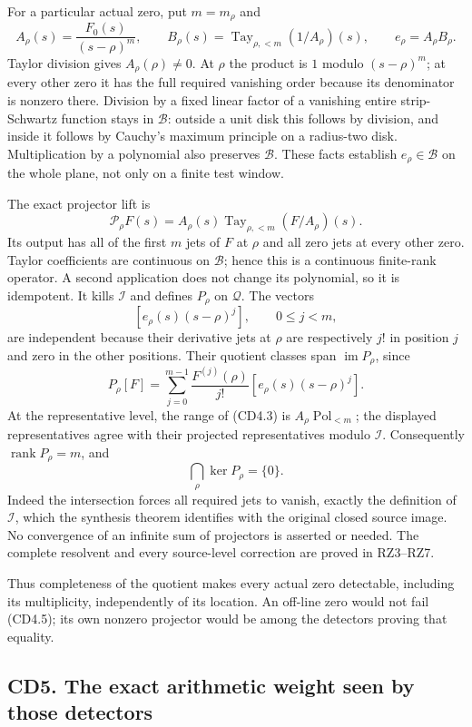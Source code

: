 \documentclass[
]{article}
\begin{document}
For a particular actual zero, put \(m=m_\rho\) and \[
A_\rho(s)=\frac{F_0(s)}{(s-\rho)^m},\qquad
B_\rho(s)=\operatorname{Tay}_{\rho,<m}(1/A_\rho)(s),\qquad
e_\rho=A_\rho B_\rho.
\tag{CD4.2}
\] Taylor division gives \(A_\rho(\rho)\ne0\). At \(\rho\) the product
is \(1\) modulo \((s-\rho)^m\); at every other zero it has the full
required vanishing order because its denominator is nonzero there.
Division by a fixed linear factor of a vanishing entire strip-Schwartz
function stays in \(\mathcal B\): outside a unit disk this follows by
division, and inside it follows by Cauchy's maximum principle on a
radius-two disk. Multiplication by a polynomial also preserves
\(\mathcal B\). These facts establish \(e_\rho\in\mathcal B\) on the
whole plane, not only on a finite test window.

The exact projector lift is \[
\mathscr P_\rho F(s)=A_\rho(s)
\operatorname{Tay}_{\rho,<m}(F/A_\rho)(s).
\tag{CD4.3}
\] Its output has all of the first \(m\) jets of \(F\) at \(\rho\) and
all zero jets at every other zero. Taylor coefficients are continuous on
\(\mathcal B\); hence this is a continuous finite-rank operator. A
second application does not change its polynomial, so it is idempotent.
It kills \(\mathcal I\) and defines \(P_\rho\) on \(\mathcal Q\). The
vectors \[
[e_\rho(s)(s-\rho)^j],\qquad 0\le j<m,
\tag{CD4.4}
\] are independent because their derivative jets at \(\rho\) are
respectively \(j!\) in position \(j\) and zero in the other positions.
Their quotient classes span \(\operatorname{im}P_\rho\), since \[
P_\rho[F]=\sum_{j=0}^{m-1}\frac{F^{(j)}(\rho)}{j!}
[e_\rho(s)(s-\rho)^j].
\] At the representative level, the range of (CD4.3) is
\(A_\rho\operatorname{Pol}_{<m}\); the displayed representatives agree
with their projected representatives modulo \(\mathcal I\). Consequently
\(\operatorname{rank}P_\rho=m\), and \[
\bigcap_{\rho}\ker P_\rho=\{0\}.
\tag{CD4.5}
\] Indeed the intersection forces all required jets to vanish, exactly
the definition of \(\mathcal I\), which the synthesis theorem identifies
with the original closed source image. No convergence of an infinite sum
of projectors is asserted or needed. The complete resolvent and every
source-level correction are proved in RZ3--RZ7.

Thus completeness of the quotient makes every actual zero detectable,
including its multiplicity, independently of its location. An off-line
zero would not fail (CD4.5); its own nonzero projector would be among
the detectors proving that equality.

\subsection{CD5. The exact arithmetic weight seen by those
detectors}\label{cd5.-the-exact-arithmetic-weight-seen-by-those-detectors}
\end{document}
